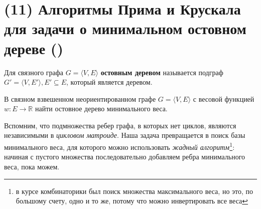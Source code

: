 \let\bf\bfseries
\let\it\itshape
\section{(11) Алгоритмы Прима и Крускала для задачи о минимальном остовном дереве (\groth)}
\begin{definition}
	Для связного графа $G=\langle V,E\rangle$ {\bf остовным деревом} называется подграф $G'=\langle V,E'\rangle,E'\subseteq E$, который является деревом.
\end{definition}
\begin{problem*}
	В связном взвешенном неориентированном графе $G=\langle V,E\rangle$ с весовой функцией $w\colon E\to\mathbb{R}$ найти остовное дерево минимального веса.
\end{problem*}
Вспомним, что подмножества ребер графа, в которых нет циклов, являются независимыми в {\it цикловом матроиде}. Наша задача превращается в поиск базы минимального веса, для которого можно использовать {\it жадный алгоритм}\footnote{в курсе комбинаторики был поиск множества максимального веса, но это, по большому счету, одно и то же, потому что можно инвертировать все веса}: начиная с пустого множества последовательно добавляем ребра минимального веса, пока можем.

